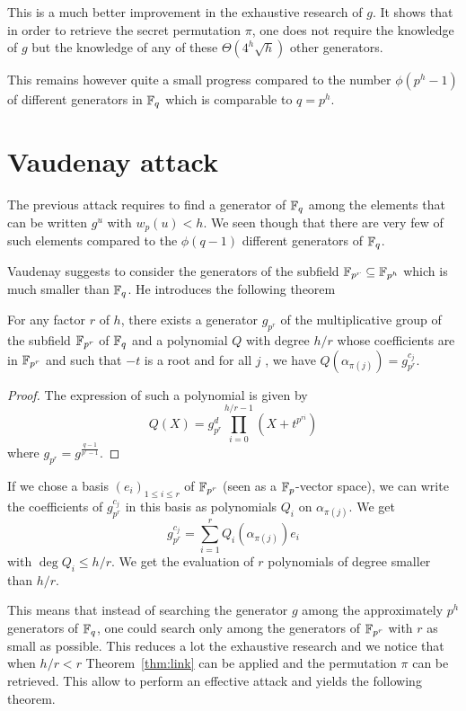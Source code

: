 \documentclass[a4paper]{article}
\newcommand{\GF}[1]{\F_{#1}}
\begin{document}
This is a much better improvement in the exhaustive research of $g$. It shows that in order to retrieve the secret permutation $\pi$, one does not require the knowledge of $g$ but the knowledge of any of these $\Theta\left( 4^h \sqrt{h} \right)$ other generators.  

This remains however quite a small progress compared to the number $\phi(p^h-1)$ of different generators in $\GF{q}$ which is comparable to $q = p^h$.


\section{Vaudenay attack}
\label{sec:Vau}

The previous attack requires to find a generator of $\mathbb{F}_q$ among the elements that can be written $g^u$ with $w_p(u) < h$. We seen though that there are very few of such elements compared to the $\phi(q-1)$ different generators of $\mathbb{F}_q$.

Vaudenay suggests \cite{Vau01} to consider the generators of the subfield $\mathbb{F}_{p^r} \subseteq \mathbb{F}_{p^h}$ which is much smaller than $\mathbb{F}_q$. He introduces the following theorem
\begin{theorem}
For any factor $r$ of $h$, there exists a generator $g_{p^r}$ of the multiplicative group of the subfield $\mathbb{F}_{p^r}$ of $\mathbb{F}_q$ and a polynomial $Q$ with degree $h/r$ whose coefficients are in $\mathbb{F}_{p^r}$ and such that $-t$ is a root and for all $j$ , we have $Q(\alpha_{\pi(j)}) = g_{p^r}^{c_j}$.
\end{theorem}
\begin{proof}
The expression of such a polynomial is given by
$$ Q(X) = g_{p^r}^d \prod_{i=0}^{h/r-1} \left( X + t^{p^{ri}} \right) $$
where $g_{p^r} = g^{\frac{q-1}{p^r-1}}$. 
\end{proof}

If we chose a basis $(e_i)_{1 \leq i \leq r}$ of $\GF{p^r}$ (seen as a $\mathbb{F}_p$-vector space), we can write the coefficients of $g_{p^r}^{c_j}$ in this basis as polynomials $Q_i$ on $\alpha_{\pi(j)}$. We get
$$ g_{p^r}^{c_j} = \sum_{i=1}^r Q_i(\alpha_{\pi(j)}) e_i $$
with $\deg Q_i \leq h/r$. We get the evaluation of $r$ polynomials of degree smaller than $h/r$.

This means that instead of searching the generator $g$ among the approximately $p^h$ generators of $\mathbb{F}_q$, one could search only among the generators of $\mathbb{F}_{p^r}$ with $r$ as small as possible. This reduces a lot the exhaustive research and we notice that when $h/r < r$ Theorem~\ref{thm:link} can be applied and the permutation $\pi$ can be retrieved. This allow to perform an effective attack and yields the following theorem.
\end{document}
